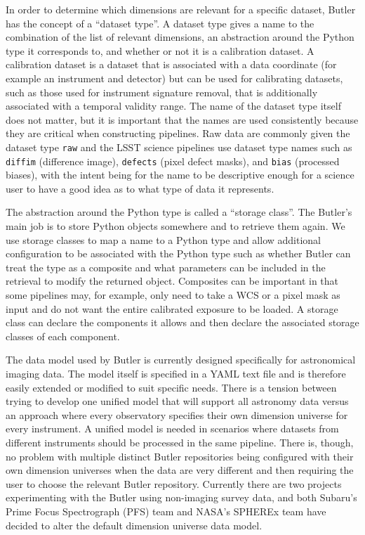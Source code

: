 \documentclass[]{spie}
\begin{document}
In order to determine which dimensions are relevant for a specific dataset, Butler has the concept of a ``dataset type''.
A dataset type gives a name to the combination of the list of relevant dimensions, an abstraction around the Python type it corresponds to, and whether or not it is a calibration dataset.
A calibration dataset is a dataset that is associated with a data coordinate (for example an instrument and detector) but can be used for calibrating datasets, such as those used for instrument signature removal, that is additionally associated with a temporal validity range.
The name of the dataset type itself does not matter, but it is important that the names are used consistently because they are critical when constructing pipelines.
Raw data are commonly given the dataset type \texttt{raw} and the LSST science pipelines use dataset type names such as \texttt{diffim} (difference image), \texttt{defects} (pixel defect masks), and \texttt{bias} (processed biases), with the intent being for the name to be descriptive enough for a science user to have a good idea as to what type of data it represents.

The abstraction around the Python type is called a ``storage class''.
The Butler's main job is to store Python objects somewhere and to retrieve them again.
We use storage classes to map a name to a Python type and allow additional configuration to be associated with the Python type such as whether Butler can treat the type as a composite and what parameters can be included in the retrieval to modify the returned object.
Composites can be important in that some pipelines may, for example, only need to take a WCS or a pixel mask as input and do not want the entire calibrated exposure to be loaded.
A storage class can declare the components it allows and then declare the associated storage classes of each component.

The data model used by Butler is currently designed specifically for astronomical imaging data.
The model itself is specified in a YAML text file and is therefore easily extended or modified to suit specific needs.
There is a tension between trying to develop one unified model that will support all astronomy data versus an approach where every observatory specifies their own dimension universe for every instrument.
A unified model is needed in scenarios where datasets from different instruments should be processed in the same pipeline.
There is, though, no problem with multiple distinct Butler repositories being configured with their own dimension universes when the data are very different and then requiring the user to choose the relevant Butler repository.
Currently there are two projects experimenting with the Butler using non-imaging survey data, and both Subaru's Prime Focus Spectrograph (PFS) team\cite{2020SPIE11447E..7VW} and NASA's SPHEREx team\cite{2020SPIE11443E..0IC} have decided to alter the default dimension universe data model.
\end{document}
